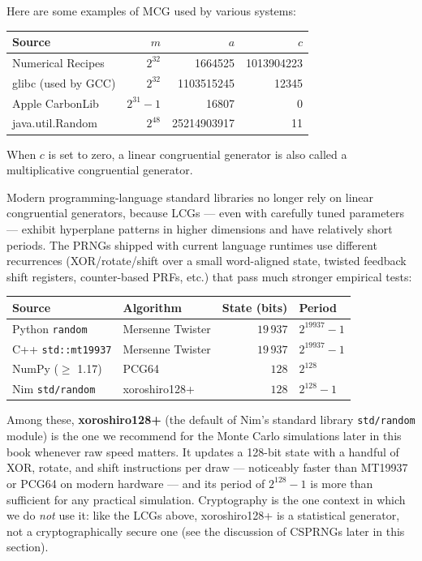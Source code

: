 \documentclass[justified, sixbynine]{tufte-book}
\def\ft{\small\tt}
\theoremstyle{plain}%
\newtheorem * {corollary}{Corollary}
\theoremstyle{definition}
\theoremstyle{remark}
\newtheorem * {remark}{Remark}
\newtheorem * {note}{Note}
\begin{document}
\begin{fullwidth}
Here are some examples of MCG used by various systems:

\begin{tabular}{|lrrr|} \hline
Source & $m$ & $a$ & $c$ \\ \hline
Numerical Recipes & $2^{32}$ & 1664525 & 1013904223 \\
glibc (used by GCC) & $2^{32}$ & 1103515245 & 12345 \\
Apple CarbonLib & $2^{31} - 1$ & 16807 & 0 \\
java.util.Random & $2^{48}$ & 25214903917 & 11 \\ \hline
\end{tabular}

When $c$ is set to zero, a linear congruential generator is also called a multiplicative congruential generator.

Modern programming-language standard libraries no longer rely on linear congruential generators, because LCGs --- even with carefully tuned parameters --- exhibit hyperplane patterns in higher dimensions and have relatively short periods. The PRNGs shipped with current language runtimes use different recurrences (XOR/rotate/shift over a small word-aligned state, twisted feedback shift registers, counter-based PRFs, etc.) that pass much stronger empirical tests:

\begin{center}\small
\setlength{\tabcolsep}{4pt}
\begin{tabular}{|llrl|} \hline
Source & Algorithm & State (bits) & Period \\ \hline
Python {\ft random} & Mersenne Twister & $19\,937$ & $2^{19937}-1$ \\
C++ {\ft std::mt19937} & Mersenne Twister & $19\,937$ & $2^{19937}-1$ \\
NumPy ($\geq$ 1.17) & PCG64 & $128$ & $2^{128}$ \\
Nim {\ft std/random} & xoroshiro128+ & $128$ & $2^{128}-1$ \\ \hline
\end{tabular}
\end{center}

Among these, {\bf xoroshiro128+} (the default of Nim's standard library {\ft std/random} module) is the one we recommend for the Monte Carlo simulations later in this book whenever raw speed matters. It updates a 128-bit state with a handful of XOR, rotate, and shift instructions per draw --- noticeably faster than MT19937 or PCG64 on modern hardware --- and its period of $2^{128}-1$ is more than sufficient for any practical simulation. Cryptography is the one context in which we do {\it not} use it: like the LCGs above, xoroshiro128+ is a statistical generator, not a cryptographically secure one (see the discussion of CSPRNGs later in this section).


\end{fullwidth}
\end{document}
